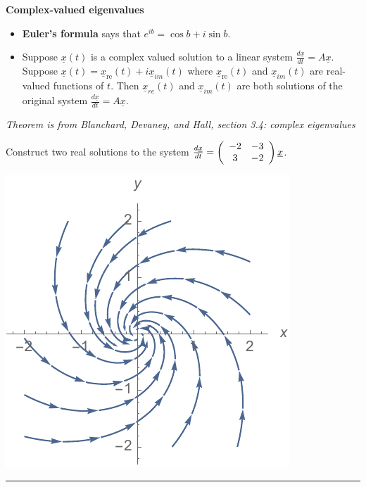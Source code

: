 \documentclass[12pt,letterpaper,noanswers]{exam}
\begin{document}
\noindent\textbf{Complex-valued eigenvalues}
\begin{tcolorbox}
\begin{itemize}
    \item \textbf{Euler's formula} says that $e^{ib} = \cos b + i\sin b$.
    \item Suppose $\underline{x}(t)$ is a complex valued solution to a linear system $\frac{d\underline{x}}{dt}= A\underline{x}$.  Suppose $\underline{x}(t) = \underline{x}_{\text{re}}(t) + i\underline{x}_{im}(t)$ where $\underline{x}_{\text{re}}(t)$ and $\underline{x}_{im}(t)$ are real-valued functions of $t$.  Then $\underline{x}_{re}(t)$ and $\underline{x}_{im}(t)$ are both solutions of the original system $\frac{d\underline{x}}{dt}= A\underline{x}$.
\end{itemize}
\emph{Theorem is from Blanchard, Devaney, and Hall, section 3.4: complex eigenvalues}

\end{tcolorbox}

Construct two real solutions to the system $\frac{d\underline{x}}{dt} = \left(\begin{array}{c c}-2 & -3 \\ 3 & -2\end{array}\right)\underline{x}$.

\includegraphics{img/C36phase.pdf}


\vspace{0.2cm}
\hrule
\vspace{0.2cm}
\end{document}
